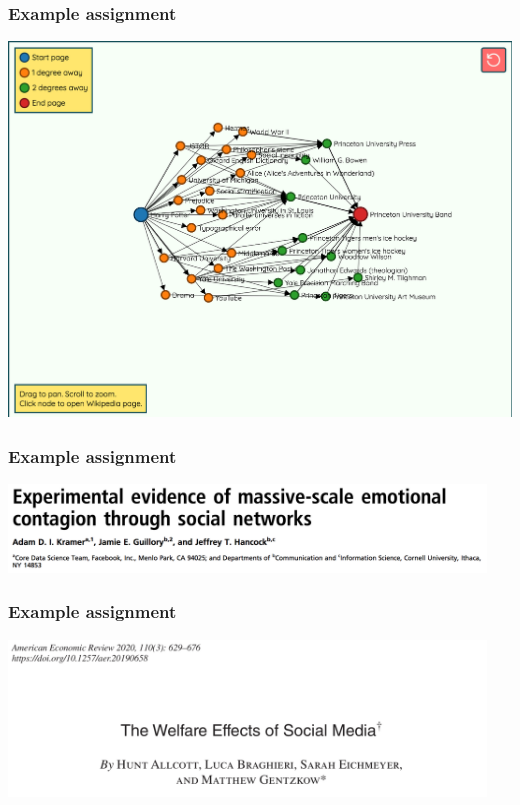 \documentclass[aspectratio=169]{beamer}
\begin{document}
\begin{frame}
\frametitle{Example assignment}

\begin{center}
\includegraphics[height=0.9\textheight]{figures/six_degrees_wikipedia_example}
\end{center}

\vfill
{}

\end{frame}
\begin{frame}
\frametitle{Example assignment}

\begin{center}
\includegraphics[width=0.95\textwidth]{figures/kramer_experimental_2014_title}
\end{center}

\vfill
{}

\end{frame}
\begin{frame}
\frametitle{Example assignment}

\begin{center}
\includegraphics[width=0.95\textwidth]{figures/allcott_welfare_2020_title}
\end{center}

\vfill
{}

\end{frame}
\end{document}
